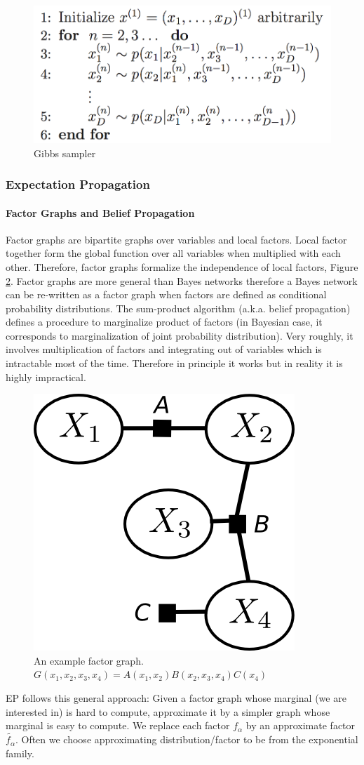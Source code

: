 \documentclass[12pt]{article}
\begin{document}
\begin{figure}[!ht]
	\centering
	\includegraphics[width=0.55\columnwidth]{gibbs}	
	\caption{Gibbs sampler}
	\label{gibbs}
\end{figure}


\subsubsection{Expectation Propagation}
\paragraph{Factor Graphs and Belief Propagation}
Factor graphs are bipartite graphs over variables and local factors. Local factor together form the global function over all variables when multiplied with each other. Therefore, factor graphs formalize the independence of local factors, Figure \ref{fg}. Factor graphs are more general than Bayes networks therefore a Bayes network can be re-written as a factor graph when factors are defined as conditional probability distributions. The sum-product algorithm \cite{loeliger2001factor} (a.k.a. belief propagation) defines a procedure to marginalize product of factors (in Bayesian case, it corresponds to marginalization of joint probability distribution). Very roughly, it involves multiplication of factors and integrating out of variables which is intractable most of the time. Therefore in principle it works but in reality it is highly impractical.
\begin{figure}[!ht]
	\centering
	\includegraphics[width=0.2\columnwidth]{fg}	
	\caption{An example factor graph. $G(x_1, x_2, x_3, x_4) = A(x_1, x_2) B(x_2, x_3, x_4) C(x_4)$}
	\label{fg}
\end{figure}

EP follows this general approach: Given a factor graph whose marginal (we are interested in) is hard to compute, approximate it by a simpler graph whose marginal is easy to compute. We replace each factor $f_\alpha$ by an approximate factor $\tilde{f_\alpha}$. Often we choose approximating distribution/factor to be from the exponential family. 
\end{document}

